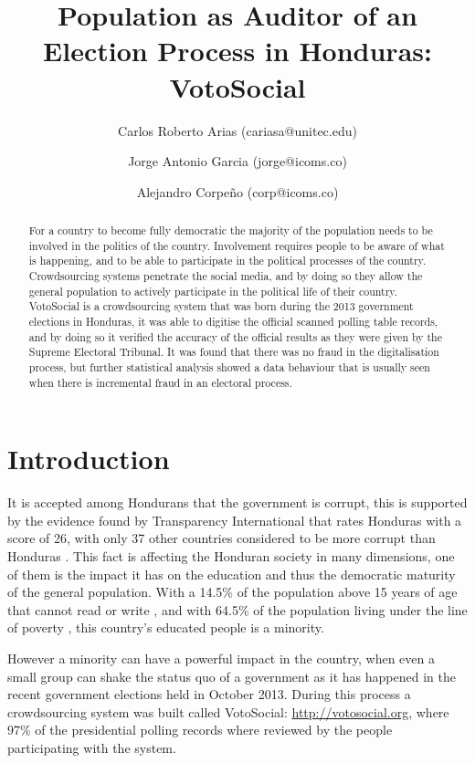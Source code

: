 \documentclass[letterpaper,10pt]{article}
\title{Population as Auditor of an Election Process in Honduras: VotoSocial}
\author[1,2]{Carlos Roberto Arias (cariasa@unitec.edu)}
\author[1,3]{Jorge Antonio Garcia (jorge@icoms.co)}
\author[3]{Alejandro Corpeño (corp@icoms.co)}
\affil[1]{Facultad de Ingenier\'{i}a, UNITEC, Tegucigalpa, Honduras}
\affil[2]{Instituto de Investigaci\'{o}n de Pol\'{i}ticas P\'{u}blicas, UNITEC, Tegucigalpa, Honduras}
\affil[3]{Icoms Technologies S de RL, Tegucigalpa, Honduras}
\begin{document}
\maketitle

\begin{abstract}
For a country to become fully democratic the majority of the population needs to be involved in the politics of the country. Involvement requires people to be aware of what is happening, and to be able to participate in the political processes of the country. Crowdsourcing systems penetrate the social media, and by doing so they allow the general population to actively participate in the political life of their country. VotoSocial is a crowdsourcing system that was born during the 2013 government elections in Honduras, it was able to digitise the official scanned polling table records, and by doing so it verified the accuracy of the official results as they were given by the Supreme Electoral Tribunal. It was found that there was no fraud in the digitalisation process, but further statistical analysis showed a data behaviour that is usually seen when there is incremental fraud in an electoral process.
\end{abstract}

\section{Introduction}
It is accepted among Hondurans that the government is corrupt, this is supported by the evidence found by Transparency International that rates Honduras with a score of 26, with only 37 other countries considered to be more corrupt than Honduras \citep{transp}. This fact is affecting the Honduran society in many dimensions, one of them is the impact it has on the education and thus the democratic maturity of the general population. With a 14.5\% of the population above 15 years of age that cannot read or write \citep{bchrep}, and with 64.5\% of the population living under the line of poverty \citep{wbdata}, this country's educated people is a minority.


However a minority can have a powerful impact in the country, when even a small group can shake the status quo of a government \citep{saadia2014} as it has happened in the recent government elections held in October 2013. During this process a crowdsourcing system was built called VotoSocial: \url{http://votosocial.org}, where 97\% of the presidential polling records where reviewed by the people participating with the system.
\end{document}

